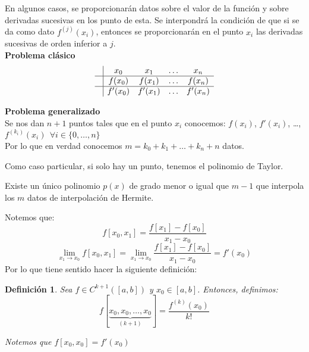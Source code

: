 \noindent
En algunos casos, se proporcionarán datos sobre el valor de la función y sobre derivadas sucesivas
en los punto de esta.\newline
Se interpondrá la condición de que si se da como dato $f^{(j)}(x_i)$, entonces se proporcionarán
en el punto $x_i$ las derivadas sucesivas de orden inferior a $j$.\\

\textbf{Problema clásico}
$$\begin{array}{c|cccc}
         & x_0     & x_1     & \ldots & x_n     \\
        \hline
         & f(x_0)  & f(x_1)  & \ldots & f(x_n)  \\
        \hline
         & f'(x_0) & f'(x_1) & \ldots & f'(x_n)
    \end{array}$$

\textbf{Problema generalizado}\\

\noindent
Se nos dan $n+1$ puntos tales que en el punto $x_i$ conocemos: $f(x_i)$, $f'(x_i)$, \ldots, $f^{(k_i)}(x_i)
    ~~\forall i \in \{0, \ldots, n\}$\\

\noindent
Por lo que en verdad conocemos $m = k_0 + k_1 + \ldots + k_n + n$ datos.

\begin{observacion}
Como caso particular, si solo hay un punto, tenemos el polinomio de Taylor.  
\end{observacion}

\begin{prop}
    Existe un único polinomio $p(x)$ de grado menor o igual que $m-1$ que interpola los $m$ datos de interpolación
    de Hermite.
\end{prop}

\bigskip
\noindent
Notemos que:
$$f[x_0,x_1] = \dfrac{f[x_1]-f[x_0]}{x_1-x_0}$$
$$\lim_{x_1 \to x_0}f[x_0,x_1] = \lim_{x_1 \to x_0} \dfrac{f[x_1]-f[x_0]}{x_1-x_0} = f'(x_0)$$
Por lo que tiene sentido hacer la siguiente definición:

\bigskip
\newtheorem*{defDifDiv}{Definición}
\begin{defDifDiv}
    Sea $f \in C^{k+1}([a,b])$ y $x_0 \in [a,b]$. Entonces, definimos:
    $$f[\underbrace{x_0, x_0, \ldots, x_0}_{(k+1)}] = \dfrac{f^{(k)}(x_0)}{k!}$$

    Notemos que $f[x_0,x_0] = f'(x_0)$
\end{defDifDiv}

